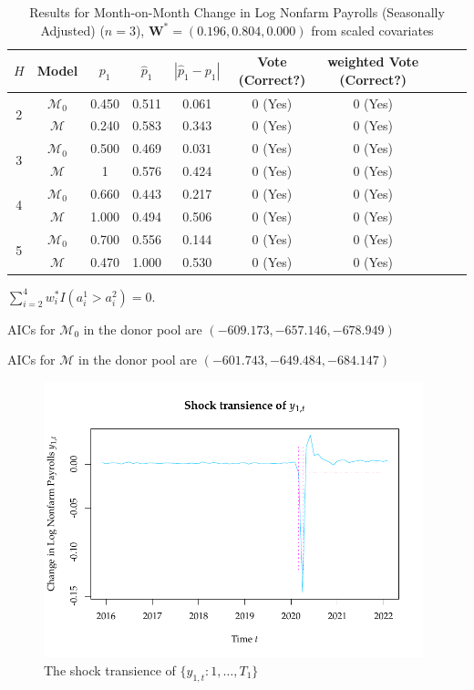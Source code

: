 \documentclass[11pt]{article}
\def\mbf#1{\mathbf{#1}} %
\def\mc#1{\mathcal{#1}} %
\def\mc#1{\mathcal{#1}}
\theoremstyle{definition}
\begin{document}
\begin{table}[H]
	\caption{Results for Month-on-Month Change in Log Nonfarm Payrolls (Seasonally Adjusted) ($n=3$), $\mbf{W}^* = (0.196, 0.804, 0.000)$ from scaled covariates}   \label{uemtable}
\begin{center}
  \begin{tabular}{cccccccccr}
     $H$  & Model &   $p_1$ & $\hat{p}_1$ & $|\hat{p}_1-p_1|$ & Vote (Correct?) & weighted Vote (Correct?)   \\
     \hline 
     \multirow{2}{*}{2} & $\mc{M}_0$  &   0.450 & 0.511  & 0.061 & 0 (Yes) & 0 (Yes)\\      
      & $\mc{M}$  & 0.240 & 0.583 & $0.343$   & 0 (Yes) &0 (Yes)   \\[.2cm]
     \multirow{2}{*}{3} & $\mc{M}_0$ &   0.500 & 0.469  & $0.031$ & 0 (Yes) & 0 (Yes)    \\
      &  $\mc{M}$ & 1 & 0.576 & 0.424 & 0 (Yes) & 0 (Yes)  \\[.2cm]
     \multirow{2}{*}{4} &  $\mc{M}_0$ &   0.660   & $0.443$ & 0.217 & 0 (Yes) & 0 (Yes)  \\
      &  $\mc{M}$ & 1.000 & 0.494  & 0.506 & 0 (Yes) & 0 (Yes) \\[.2cm]
     \multirow{2}{*}{5} & $\mc{M}_0$ & 0.700  & 0.556 & 0.144 & 0 (Yes) & 0 (Yes)\\
     & $\mc{M}$ & 0.470 & 1.000 & 0.530 & 0 (Yes) & 0 (Yes)
  \end{tabular}
\end{center}	
\end{table}

$\sum_{i=2}^4 w_i^* I(a_i^1 > a_i^2)=0$. 

AICs for $\mc{M}_0$ in the donor pool are $(-609.173, -657.146,-678.949)$

AICs for $\mc{M}$ in the donor pool are $(-601.743,-649.484,-684.147)$


\begin{figure}[H]
	\begin{center}
		\includegraphics[height = 8cm]{UEMtransience.pdf}
		\caption{The shock transience of $\{y_{1,t} \colon 1, \ldots, T_1\}$} \label{uemshocktransience}
	\end{center}	
\end{figure}
\end{document}
